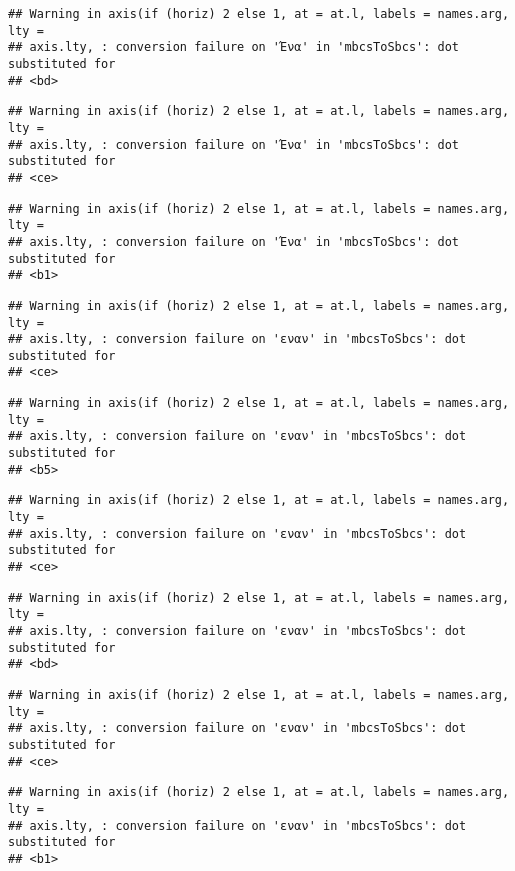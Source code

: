 \documentclass[
]{article}
\begin{document}
\begin{verbatim}
## Warning in axis(if (horiz) 2 else 1, at = at.l, labels = names.arg, lty =
## axis.lty, : conversion failure on 'Ένα' in 'mbcsToSbcs': dot substituted for
## <bd>
\end{verbatim}

\begin{verbatim}
## Warning in axis(if (horiz) 2 else 1, at = at.l, labels = names.arg, lty =
## axis.lty, : conversion failure on 'Ένα' in 'mbcsToSbcs': dot substituted for
## <ce>
\end{verbatim}

\begin{verbatim}
## Warning in axis(if (horiz) 2 else 1, at = at.l, labels = names.arg, lty =
## axis.lty, : conversion failure on 'Ένα' in 'mbcsToSbcs': dot substituted for
## <b1>
\end{verbatim}

\begin{verbatim}
## Warning in axis(if (horiz) 2 else 1, at = at.l, labels = names.arg, lty =
## axis.lty, : conversion failure on 'εναν' in 'mbcsToSbcs': dot substituted for
## <ce>
\end{verbatim}

\begin{verbatim}
## Warning in axis(if (horiz) 2 else 1, at = at.l, labels = names.arg, lty =
## axis.lty, : conversion failure on 'εναν' in 'mbcsToSbcs': dot substituted for
## <b5>
\end{verbatim}

\begin{verbatim}
## Warning in axis(if (horiz) 2 else 1, at = at.l, labels = names.arg, lty =
## axis.lty, : conversion failure on 'εναν' in 'mbcsToSbcs': dot substituted for
## <ce>
\end{verbatim}

\begin{verbatim}
## Warning in axis(if (horiz) 2 else 1, at = at.l, labels = names.arg, lty =
## axis.lty, : conversion failure on 'εναν' in 'mbcsToSbcs': dot substituted for
## <bd>
\end{verbatim}

\begin{verbatim}
## Warning in axis(if (horiz) 2 else 1, at = at.l, labels = names.arg, lty =
## axis.lty, : conversion failure on 'εναν' in 'mbcsToSbcs': dot substituted for
## <ce>
\end{verbatim}

\begin{verbatim}
## Warning in axis(if (horiz) 2 else 1, at = at.l, labels = names.arg, lty =
## axis.lty, : conversion failure on 'εναν' in 'mbcsToSbcs': dot substituted for
## <b1>
\end{verbatim}
\end{document}
